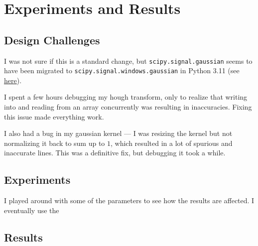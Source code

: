\section{Experiments and Results}

\subsection{Design Challenges}
\begin{enumroman}
  \item I was not sure if this is a standard change,
    but \lstinline{scipy.signal.gaussian} seems to have been
    migrated to \lstinline{scipy.signal.windows.gaussian}
    in Python 3.11 (see \href{https://docs.scipy.org/doc/scipy/reference/generated/scipy.signal.windows.gaussian.html}{here}).
  \item I spent a few hours debugging my hough transform,
    only to realize that writing into and reading from
    an array concurrently was resulting in
    inaccuracies.
    Fixing this issue made everything work.
  \item I also had a bug in my gaussian kernel
     --- I was resizing the kernel but not normalizing it
    back to sum up to $1$, which resulted in
    a lot of spurious and inaccurate lines.
    This was a definitive fix, but debugging it took a while.
\end{enumroman}

\subsection{Experiments}

I played around with some of the parameters to see how the results
are affected.
I eventually use the 

\subsection{Results}
